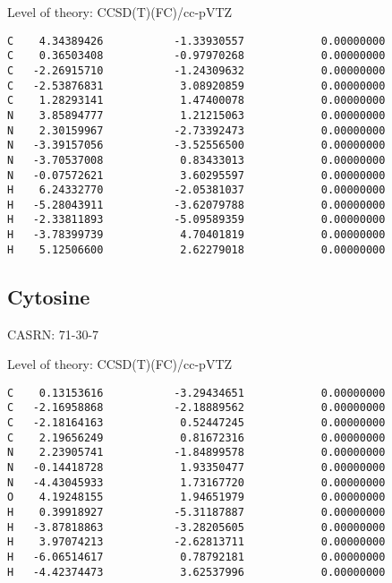 \documentclass[journal=jctcce,manuscript=article,layout=traditional]{achemso}
\newcommand{\TZ}{cc-pVTZ}
\begin{document}
\begin{singlespace}
\noindent Level of theory: CCSD(T)(FC)/{\TZ}
\begin{verbatim}
C    4.34389426           -1.33930557            0.00000000
C    0.36503408           -0.97970268            0.00000000
C   -2.26915710           -1.24309632            0.00000000
C   -2.53876831            3.08920859            0.00000000
C    1.28293141            1.47400078            0.00000000
N    3.85894777            1.21215063            0.00000000
N    2.30159967           -2.73392473            0.00000000
N   -3.39157056           -3.52556500            0.00000000
N   -3.70537008            0.83433013            0.00000000
N   -0.07572621            3.60295597            0.00000000
H    6.24332770           -2.05381037            0.00000000
H   -5.28043911           -3.62079788            0.00000000
H   -2.33811893           -5.09589359            0.00000000
H   -3.78399739            4.70401819            0.00000000
H    5.12506600            2.62279018            0.00000000
\end{verbatim}
\end{singlespace}

\subsection{Cytosine}

CASRN: 71-30-7

\begin{singlespace}
\noindent Level of theory: CCSD(T)(FC)/{\TZ}
\begin{verbatim}
C    0.13153616           -3.29434651            0.00000000                          
C   -2.16958868           -2.18889562            0.00000000                          
C   -2.18164163            0.52447245            0.00000000                          
C    2.19656249            0.81672316            0.00000000                          
N    2.23905741           -1.84899578            0.00000000                          
N   -0.14418728            1.93350477            0.00000000                          
N   -4.43045933            1.73167720            0.00000000                          
O    4.19248155            1.94651979            0.00000000                          
H    0.39918927           -5.31187887            0.00000000                          
H   -3.87818863           -3.28205605            0.00000000                          
H    3.97074213           -2.62813711            0.00000000                          
H   -6.06514617            0.78792181            0.00000000                          
H   -4.42374473            3.62537996            0.00000000                          
\end{verbatim}
\end{singlespace}
\end{document}
